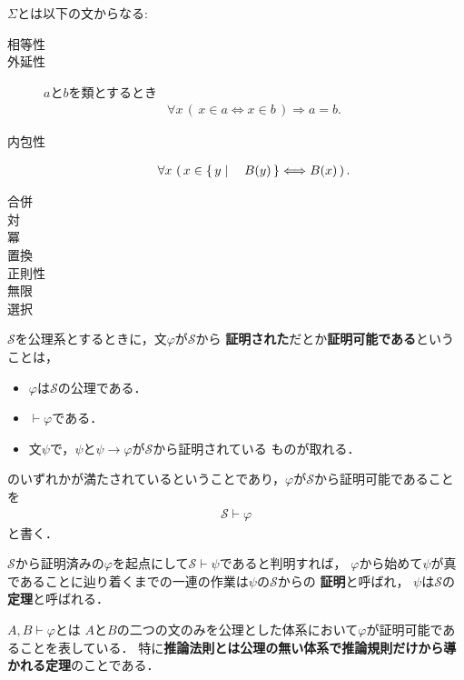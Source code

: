 	$\Sigma$とは以下の文からなる:
	\begin{description}
		\item[相等性]
		\item[外延性] $a$と$b$を類とするとき
			\begin{align}
				\forall x\, (\, x \in a \Longleftrightarrow x \in b\, )
				\Longrightarrow a = b.
			\end{align}
			
		\item[内包性] 
			\begin{align}
				\forall x\, \left(\, x \in \left\{\, y \mid \quad B(y)\, \right\} \Longleftrightarrow B(x)\, \right).
			\end{align}
			
		\item[合併]
		\item[対]
		\item[冪]
		\item[置換]
		\item[正則性]
		\item[無限]
		\item[選択]
	\end{description}
	
	$\mathscr{S}$を公理系とするときに，文$\varphi$が$\mathscr{S}$から
	{\bf 証明された}だとか{\bf 証明可能である}ということは，
	\begin{itemize}
		\item $\varphi$は$\mathscr{S}$の公理である．
		\item $\vdash \varphi$である．
		\item 文$\psi$で，$\psi$と$\psi \rightarrow \varphi$が$\mathscr{S}$から証明されている
			ものが取れる．
	\end{itemize}
	
	のいずれかが満たされているということであり，$\varphi$が$\mathscr{S}$から証明可能であることを
	\begin{align}
		\mathscr{S} \vdash \varphi
	\end{align}
	と書く．
	
	$\mathscr{S}$から証明済みの$\varphi$を起点にして$\mathscr{S} \vdash \psi$であると判明すれば，
	$\varphi$から始めて$\psi$が真であることに辿り着くまでの一連の作業は$\psi$の$\mathscr{S}$からの
	{\bf 証明}と呼ばれ，
	$\psi$は$\mathscr{S}$の{\bf 定理}と呼ばれる．
	
	$A,B \vdash \varphi$とは
	$A$と$B$の二つの文のみを公理とした体系において$\varphi$が証明可能であることを表している．
	特に{\bf 推論法則とは公理の無い体系で推論規則だけから導かれる定理}のことである．
	
